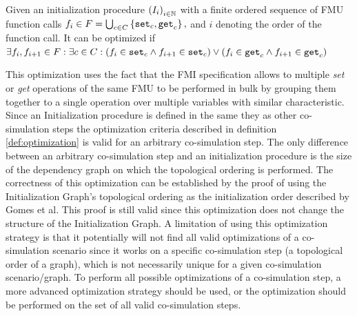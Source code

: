 \documentclass[runningheads]{llncs}
\begin{document}
\begin{definition}\label{def:optimization}
  Given an initialization procedure $ \left( I_i \right)_{i \in \mathbb{N}}$ with a finite ordered sequence of FMU function calls $f_i \in F = \bigcup_{c \in C}  \left\{ \mathtt{set}_{c},\mathtt{get}_{c} \right\},$ and $i$ denoting the order of the function call. It can be optimized if $\exists f_i, f_{i +1} \in F : \exists c \in C :(f_i \in {\mathtt{set}_{c}} \land f_{i+1} \in {\mathtt{set}_{c}}) \lor (f_i \in {\mathtt{get}_{c}} \land f_{i+1} \in {\mathtt{get}_{c}})$
\end{definition}
This optimization uses the fact that the FMI specification allows to multiple \textit{set} or \textit{get} operations of the same FMU to be performed in bulk by grouping them together to a single operation over multiple variables with similar characteristic.
Since an Initialization procedure is defined in the same they as other co-simulation steps the optimization criteria described in definition \ref{def:optimization} is valid for an arbitrary co-simulation step. The only difference between an arbitrary co-simulation step and an initialization procedure is the size of the dependency graph on which the topological ordering is performed. 
The correctness of this optimization can be established by the proof of using the Initialization Graph's topological ordering as the initialization order described by Gomes et al\cite{Gomes2019}. This proof is still valid since this optimization does not change the structure of the Initialization Graph. 
A limitation of using this optimization strategy is that it potentially will not find all valid optimizations of a co-simulation scenario since it works on a specific co-simulation step (a topological order of a graph), which is not necessarily unique for a given co-simulation scenario/graph. To perform all possible optimizations of a co-simulation step, a more advanced optimization strategy should be used, or the optimization should be performed on the set of all valid co-simulation steps.
\end{document}
